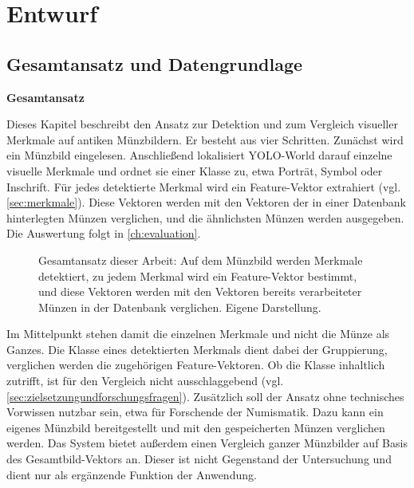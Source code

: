 
\chapter{Entwurf}\label{ch:entwurf}
\glsresetall %

\section{Gesamtansatz und Datengrundlage}
\label{sec:gesamtansatzdatengrundlage}
\textbf{Gesamtansatz}

\noindent Dieses Kapitel beschreibt den Ansatz zur Detektion und zum Vergleich visueller Merkmale auf antiken Münzbildern. Er besteht aus vier Schritten. Zunächst wird ein Münzbild eingelesen. Anschließend lokalisiert YOLO-World darauf einzelne visuelle Merkmale und ordnet sie einer Klasse zu, etwa Porträt, Symbol oder Inschrift. Für jedes detektierte Merkmal wird ein Feature-Vektor extrahiert (vgl. \cref{sec:merkmale}). Diese Vektoren werden mit den Vektoren der in einer Datenbank hinterlegten Münzen verglichen, und die ähnlichsten Münzen werden ausgegeben. Die Auswertung folgt in \cref{ch:evaluation}.

\begin{figure}[H]
  \centering
  \resizebox{\linewidth}{!}{}
  \caption[Ablauf des Gesamtansatzes]{Gesamtansatz dieser Arbeit: Auf dem Münzbild werden Merkmale detektiert, zu jedem Merkmal wird ein Feature-Vektor bestimmt, und diese Vektoren werden mit den Vektoren bereits verarbeiteter Münzen in der Datenbank verglichen. Eigene Darstellung.}
  \label{fig:pipeline}
\end{figure}

\noindent Im Mittelpunkt stehen damit die einzelnen Merkmale und nicht die Münze als Ganzes. Die Klasse eines detektierten Merkmals dient dabei der Gruppierung, verglichen werden die zugehörigen Feature-Vektoren. Ob die Klasse inhaltlich zutrifft, ist für den Vergleich nicht ausschlaggebend (vgl. \cref{sec:zielsetzungundforschungsfragen}). Zusätzlich soll der Ansatz ohne technisches Vorwissen nutzbar sein, etwa für Forschende der Numismatik. Dazu kann ein eigenes Münzbild bereitgestellt und mit den gespeicherten Münzen verglichen werden. Das System bietet außerdem einen Vergleich ganzer Münzbilder auf Basis des Gesamtbild-Vektors an. Dieser ist nicht Gegenstand der Untersuchung und dient nur als ergänzende Funktion der Anwendung.

